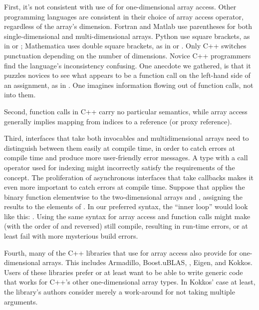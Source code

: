 \documentclass{wg21}
\begin{document}
First, it's not consistent with use of  for one-dimensional array access.  Other programming languages are consistent in their choice of array access operator, regardless of the array's dimension.  Fortran and Matlab use parentheses for both single-dimensional and multi-dimensional arrays.  Python use square brackets, as in  or ; Mathematica uses double square brackets, as in  or .  Only C++ switches punctuation depending on the number of dimensions.  Novice C++ programmers find the language's inconsistency confusing.  One anecdote we gathered, is that it puzzles novices to see what appears to be a function call on the left-hand side of an assignment, as in .  One imagines information flowing out of function calls, not into them.

Second, function calls in C++ carry no particular semantics, while array access generally implies mapping from indices to a reference (or proxy reference).

Third, interfaces that take both invocables and multidimensional arrays need to distinguish between them easily at compile time, in order to catch errors at compile time and produce more user-friendly error messages.  A type with a call operator used for indexing might incorrectly satisfy the requirements of the  concept.  The proliferation of asynchronous interfaces that take callbacks makes it even more important to catch errors at compile time.  Suppose that  applies the binary function  elementwise to the two-dimensional arrays  and , assigning the results to the elements of .  In our preferred syntax, the ``inner loop'' would look like this: .  Using the same syntax for array access and function calls might make  (with the order of  and  reversed) still compile, resulting in run-time errors, or at least fail with more mysterious build errors.

Fourth, many of the C++ libraries that use  for array access also provide  for one-dimensional arrays.  This includes Armadillo, Boost.uBLAS, , Eigen, and Kokkos.  Users of these libraries prefer  or at least want to be able to write generic code that works for C++'s other one-dimensional array types.  In Kokkos' case at least, the library's authors consider  merely a work-around for  not taking multiple arguments.
\end{document}
